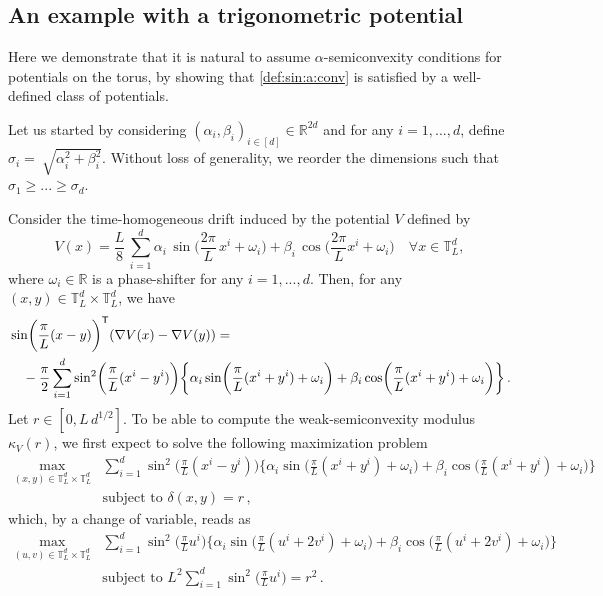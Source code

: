 \documentclass[final,12pt]{colt2023} %
\newcommand{\bes}{\begin{equation}}
\newcommand{\ees}{\end{equation}}
\begin{document}
\subsection{An example with a trigonometric potential} \label{subsec:example_V}
Here we demonstrate that it is natural to assume $\alpha$-semiconvexity conditions for potentials on the torus, by showing that \eqref{def:sin:a:conv} is satisfied by a well-defined class of potentials.

Let us started by considering $(\alpha_i, \beta_i)_{i\in [d]}\in \mathbb{R}^{2d}$ and for any $i=1, ...,d$,  define $\sigma_i=~\sqrt{\alpha_i^2 +\beta_i^2}$. Without loss of generality, we reorder the dimensions such that $\sigma_1\geq ... \geq \sigma_d$.

Consider the time-homogeneous drift induced by the potential $V$ defined by 
\bes
V(x)=\frac{L}{8}\,\sum_{i=1}^d\alpha_i\,\sin\biggl(\frac{2\pi}{L} \,x^i+\omega_i\biggr)+\beta_i\,\cos\biggl(\frac{2\pi}{L} x^i+\omega_i\biggr) \quad \forall x \in \mathbb{T}_L^d ,
\ees
where $\omega_i\in \mathbb{R}$ is a phase-shifter for any $i=1, ...,d$. Then, for any $(x,y)\in\mathbb{T}_L^d \times \mathbb{T}_L^d$, we have
\begin{equation}\label{sin_eq}
\begin{aligned}
    &\sin\biggl(\frac{\pi}{L}(x-y)\biggr)^{{\sf  T}}(\nabla V(x)-\nabla V(y))= \\
    & \quad -\frac{ \pi}{2}\sum_{i=1}^d \sin^2\biggl(\frac{\pi}{L}(x^i -y^i)\biggr)\biggl\{\alpha_i \sin\biggl(\frac{\pi }{L}(x^i+y^i)+\omega_i\biggr) + \beta_i \cos\biggl(\frac{\pi}{L} (x^i+y^i)+\omega_i\biggr)\biggr\}\,.
\end{aligned}
\end{equation}
Let $r\in [0, L \, d^{1/2}]$. To be able to compute the weak-semiconvexity modulus $\kappa_V(r)$, we first expect to solve the following maximization problem
\begin{align}
 \max_{(x,y)\in\mathbb{T}_L^d \times \mathbb{T}_L^d}
    & \sum_{i=1}^d \sin^2\biggl(\frac{\pi}{L}(x^i -y^i)\biggr)\biggl\{\alpha_i \sin\biggl(\frac{\pi }{L}(x^i+y^i)+\omega_i\biggr) + \beta_i \cos\biggl(\frac{\pi}{L} (x^i+y^i)+\omega_i\biggr)\biggr\} \\
    & \text{subject to } \delta(x,y)=r\,,
\end{align}
which, by a change of variable, reads as
\begin{equation}\label{max_pb_2}
\begin{aligned}
\max_{(u,v)\in \mathbb{T}_L^d \times \mathbb{T}_L^d} &
    \sum_{i=1}^d \sin^2\biggl(\frac{\pi}{L} u^i\biggr)\biggl\{\alpha_i \sin\biggl(\frac{\pi}{L} (u^i +2v^i)+\omega_i\biggr) + \beta_i \cos\biggl(\frac{\pi}{L} (u^i +2v^i)+\omega_i\biggr)\biggr\}\\
    &  \text{subject to } L^2 \sum_{i=1}^d \sin^2\biggl(\frac{\pi}{L} u^i\biggr)=r^2\,.
\end{aligned}
\end{equation}
\end{document}
